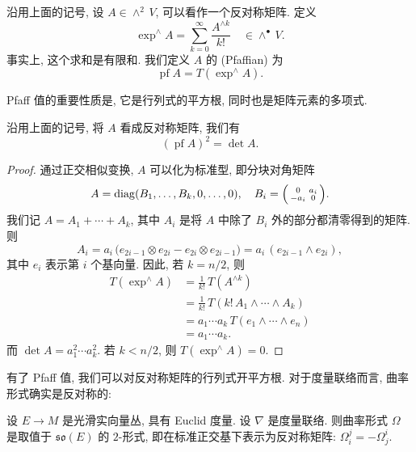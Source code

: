 \begin{definition}
    沿用上面的记号, 设 $A \in \wedge^2 \, V$, 可以看作一个反对称矩阵. 定义
    \[ \exp^{\wedge} A = \sum _{k=0} ^\infty \frac {A^{\wedge k}} {k!}
        \quad \in \wedge^\bullet \, V. \]
    事实上, 这个求和是有限和.
    我们定义 $A$ 的  (Pfaffian) 为
    \[ \operatorname{pf} A = T ( \exp^{\wedge} A ). \]
\end{definition}

Pfaff 值的重要性质是, 它是行列式的平方根, 
同时也是矩阵元素的多项式.

\begin{proposition}
    沿用上面的记号, 将 $A$ 看成反对称矩阵, 我们有
    \[ (\operatorname{pf} A)^2 = \det A. \]
\end{proposition}

\begin{proof}
    通过正交相似变换, $A$ 可以化为标准型, 即分块对角矩阵
    \[ A = \operatorname{diag} (B_1, \dotsc, B_k, 0, \dotsc, 0), \quad
        B_i = \Bigl( \begin{smallmatrix} 0 & a_i \\ -a_i & 0 \end{smallmatrix} \Bigr). \]
    我们记 $A = A_1 + \cdots + A_k$, 
    其中 $A_i$ 是将 $A$ 中除了 $B_i$ 外的部分都清零得到的矩阵. 则
    \[ A_i = a_i \, \bigl( e_{2i-1} \otimes e_{2i} - e_{2i} \otimes e_{2i-1} \bigr)
        = a_i \, (e_{2i-1} \wedge e_{2i}), \]
    其中 $e_i$ 表示第 $i$ 个基向量. 
    因此, 若 $k = n/2$, 则
    \begin{align*}
        T (\exp^\wedge A) 
        &= \frac {1} {k!} \, T (A^{\wedge k}) \\
        &= \frac {1} {k!} \, T ( k! \, A_1 \wedge \cdots \wedge A_k ) \\
        &= a_1 \cdots a_k \, T ( e_1 \wedge \cdots \wedge e_n ) \\
        &= a_1 \cdots a_k.
    \end{align*}
    而 $\det A = a_1^2 \cdots a_k^2$.
    若 $k < n/2$, 则 $T (\exp^\wedge A) = 0$.
\end{proof}

有了 Pfaff 值, 我们可以对反对称矩阵的行列式开平方根.
对于度量联络而言, 曲率形式确实是反对称的:

\begin{proposition} \label{thm-5-curv-antisym}
    设 $E \to M$ 是光滑实向量丛, 具有 Euclid 度量. 设 $\nabla$ 是度量联络.
    则曲率形式 $\Omega$ 是取值于 $\mathfrak{so}(E)$ 的 $2$-形式,
    即在标准正交基下表示为反对称矩阵: $\Omega_i^j = -\Omega_j^i$.
\end{proposition}

